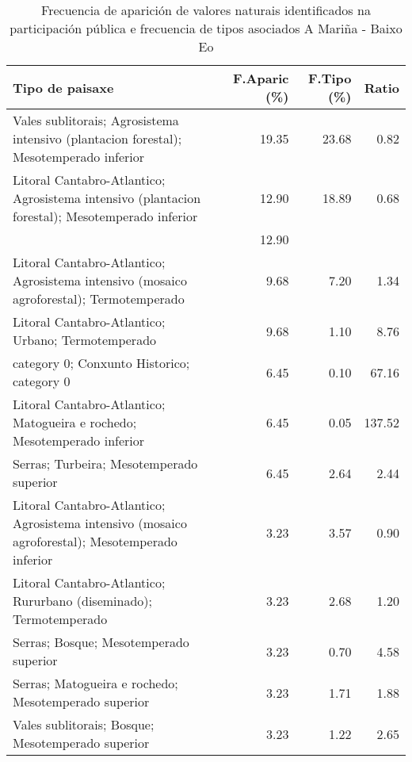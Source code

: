 \begin{table}[p]
\centering
\caption{Frecuencia de aparición de valores naturais identificados na participación pública e frecuencia de tipos asociados A Mariña - Baixo Eo} 
\label{vsixotnat2}
\begin{tabular}{lrrr}
  \hline
Tipo de paisaxe & F.Aparic (\%) & F.Tipo (\%) & Ratio \\ 
  \hline
Vales sublitorais; Agrosistema intensivo (plantacion forestal); Mesotemperado inferior & 19.35 & 23.68 & 0.82 \\ 
  Litoral Cantabro-Atlantico; Agrosistema intensivo (plantacion forestal); Mesotemperado inferior & 12.90 & 18.89 & 0.68 \\ 
   & 12.90 &  &  \\ 
  Litoral Cantabro-Atlantico; Agrosistema intensivo (mosaico agroforestal); Termotemperado & 9.68 & 7.20 & 1.34 \\ 
  Litoral Cantabro-Atlantico; Urbano; Termotemperado & 9.68 & 1.10 & 8.76 \\ 
  category 0; Conxunto Historico; category 0 & 6.45 & 0.10 & 67.16 \\ 
  Litoral Cantabro-Atlantico; Matogueira e rochedo; Mesotemperado inferior & 6.45 & 0.05 & 137.52 \\ 
  Serras; Turbeira; Mesotemperado superior & 6.45 & 2.64 & 2.44 \\ 
  Litoral Cantabro-Atlantico; Agrosistema intensivo (mosaico agroforestal); Mesotemperado inferior & 3.23 & 3.57 & 0.90 \\ 
  Litoral Cantabro-Atlantico; Rururbano (diseminado); Termotemperado & 3.23 & 2.68 & 1.20 \\ 
  Serras; Bosque; Mesotemperado superior & 3.23 & 0.70 & 4.58 \\ 
  Serras; Matogueira e rochedo; Mesotemperado superior & 3.23 & 1.71 & 1.88 \\ 
  Vales sublitorais; Bosque; Mesotemperado superior & 3.23 & 1.22 & 2.65 \\ 
   \hline
\end{tabular}
\end{table}
